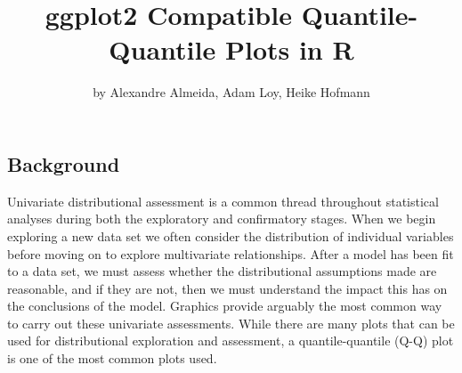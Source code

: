 \title{ggplot2 Compatible Quantile-Quantile Plots in R}
\author{by Alexandre Almeida, Adam Loy, Heike Hofmann}

\maketitle


\newcommand{\hh}[1]{{\textcolor{orange}{#1}}}
\newcommand{\al}[1]{{\textcolor{violet}{#1}}}
\newcommand{\Aa}[1]{{\textcolor{olive}{#1}}}

\subsection{Background}\label{background}

\label{sec:background}

Univariate distributional assessment is a common thread throughout
statistical analyses during both the exploratory and confirmatory
stages. When we begin exploring a new data set we often consider the
distribution of individual variables before moving on to explore
multivariate relationships. After a model has been fit to a data set, we
must assess whether the distributional assumptions made are reasonable,
and if they are not, then we must understand the impact this has on the
conclusions of the model. Graphics provide arguably the most common way
to carry out these univariate assessments. While there are many plots
that can be used for distributional exploration and assessment, a
quantile-quantile (Q-Q) plot \citep{Wilk1968-ii} is one of the most
common plots used.

